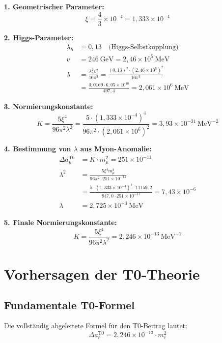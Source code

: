 \documentclass[12pt,a4paper]{article}
\theoremstyle{definition}
\begin{document}
	\begin{derivation}
		
		\textbf{1. Geometrischer Parameter:}
		\[
		\xi = \frac{4}{3} \times 10^{-4} = 1,333 \times 10^{-4}
		\]
		
		\textbf{2. Higgs-Parameter:}
		\begin{align*}
			\lambda_h &= 0,13 \quad \text{(Higgs-Selbstkopplung)}\\
			v &= 246 \ \text{GeV} = 2,46 \times 10^5 \ \text{MeV}\\
			\lambda &= \frac{\lambda_h^2 v^2}{16\pi^3} = \frac{(0,13)^2 \cdot (2,46 \times 10^5)^2}{16\pi^3}\\
			&= \frac{0,0169 \cdot 6,05 \times 10^{10}}{497,4} = 2,061 \times 10^6 \ \text{MeV}
		\end{align*}
		
		\textbf{3. Normierungskonstante:}
		\[
		K = \frac{5\xi^4}{96\pi^2\lambda^2} = \frac{5 \cdot (1,333 \times 10^{-4})^4}{96\pi^2 \cdot (2,061 \times 10^6)^2} = 3,93 \times 10^{-31} \ \text{MeV}^{-2}
		\]
		
		\textbf{4. Bestimmung von $\lambda$ aus Myon-Anomalie:}
		\begin{align*}
			\Delta a_\mu^{\text{T0}} &= K \cdot m_\mu^2 = 251 \times 10^{-11}\\
			\lambda^2 &= \frac{5\xi^4 m_\mu^2}{96\pi^2 \cdot 251 \times 10^{-11}}\\
			&= \frac{5 \cdot (1,333 \times 10^{-4})^4 \cdot 11159,2}{947,0 \cdot 251 \times 10^{-11}} = 7,43 \times 10^{-6}\\
			\lambda &= 2,725 \times 10^{-3} \ \text{MeV}
		\end{align*}
		
		\textbf{5. Finale Normierungskonstante:}
		\[
		K = \frac{5\xi^4}{96\pi^2\lambda^2} = 2,246 \times 10^{-13} \ \text{MeV}^{-2}
		\]
	\end{derivation}
	
	\section{Vorhersagen der T0-Theorie}
	
	\subsection{Fundamentale T0-Formel}
	
	Die vollständig abgeleitete Formel für den T0-Beitrag lautet:
	\begin{equation}
		\Delta a_\ell^{\text{T0}} = 2,246 \times 10^{-13} \cdot m_\ell^2
		\label{eq:final_t0_formula}
	\end{equation}
	
\end{document}
